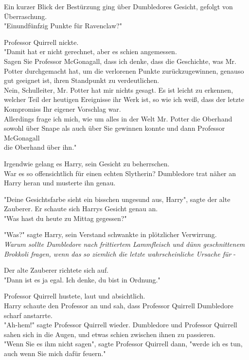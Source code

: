 {Ein kurzer Blick der Bestürzung ging über Dumbledores Gesicht, gefolgt von Überraschung.\\ "Einundfünfzig Punkte für Ravenclaw?"

Professor Quirrell nickte.\\ "Damit hat er nicht gerechnet, aber es schien angemessen.\\ Sagen Sie Professor McGonagall, dass ich denke, dass die Geschichte, was Mr. Potter durchgemacht hat, um die verlorenen Punkte zurückzugewinnen, genauso gut geeignet ist, ihren Standpunkt zu verdeutlichen.\\ Nein, Schulleiter, Mr. Potter hat mir nichts gesagt. Es ist leicht zu erkennen, welcher Teil der heutigen Ereignisse ihr Werk ist, so wie ich weiß, dass der letzte Kompromiss Ihr eigener Vorschlag war.\\ Allerdings frage ich mich, wie um alles in der Welt Mr. Potter die Oberhand sowohl über Snape als auch über Sie gewinnen konnte und dann Professor McGonagall\\ die Oberhand über ihn."

Irgendwie gelang es Harry, sein Gesicht zu beherrschen.\\ War es so offensichtlich für einen echten Slytherin? Dumbledore trat näher an Harry heran und musterte ihn genau.

"Deine Gesichtsfarbe sieht ein bisschen ungesund aus, Harry", sagte der alte Zauberer. Er schaute sich Harrys Gesicht genau an.\\ "Was hast du heute zu Mittag gegessen?"

"Was?" sagte Harry, sein Verstand schwankte in plötzlicher Verwirrung.\\ \emph{Warum sollte Dumbledore nach frittiertem Lammfleisch und dünn geschnittenem Brokkoli fragen, wenn das so ziemlich die letzte wahrscheinliche Ursache für} -

Der alte Zauberer richtete sich auf.\\ "Dann ist es ja egal. Ich denke, du bist in Ordnung."

Professor Quirrell hustete, laut und absichtlich.\\ Harry schaute den Professor an und sah, dass Professor Quirrell Dumbledore scharf anstarrte.\\ "Ah-hem!" sagte Professor Quirrell wieder. Dumbledore und Professor Quirrell sahen sich in die Augen, und etwas schien zwischen ihnen zu passieren.\\ "Wenn Sie es ihm nicht sagen", sagte Professor Quirrell dann, "werde ich es tun, auch wenn Sie mich dafür feuern."

}

